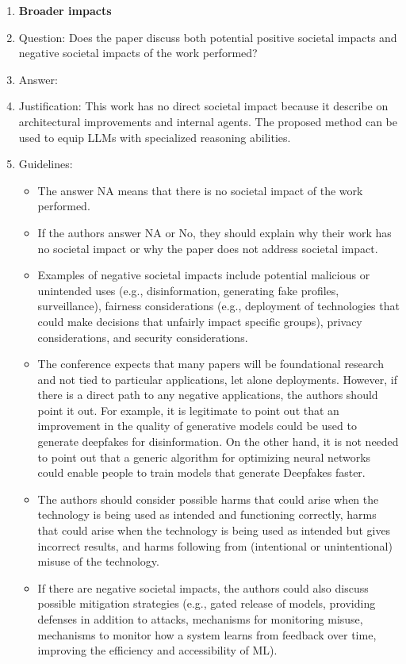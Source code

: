 \documentclass{article}
\theoremstyle{plain}
\theoremstyle{definition}
\theoremstyle{remark}
\begin{document}
\begin{enumerate}
\item {\bf Broader impacts}
    \item[] Question: Does the paper discuss both potential positive societal impacts and negative societal impacts of the work performed?
    \item[] Answer: \answerNA{} %
    \item[] Justification: This work has no direct societal impact because it describe on architectural improvements and internal agents. The proposed method can be used to equip LLMs with specialized reasoning abilities.
    \item[] Guidelines:
    \begin{itemize}
        \item The answer NA means that there is no societal impact of the work performed.
        \item If the authors answer NA or No, they should explain why their work has no societal impact or why the paper does not address societal impact.
        \item Examples of negative societal impacts include potential malicious or unintended uses (e.g., disinformation, generating fake profiles, surveillance), fairness considerations (e.g., deployment of technologies that could make decisions that unfairly impact specific groups), privacy considerations, and security considerations.
        \item The conference expects that many papers will be foundational research and not tied to particular applications, let alone deployments. However, if there is a direct path to any negative applications, the authors should point it out. For example, it is legitimate to point out that an improvement in the quality of generative models could be used to generate deepfakes for disinformation. On the other hand, it is not needed to point out that a generic algorithm for optimizing neural networks could enable people to train models that generate Deepfakes faster.
        \item The authors should consider possible harms that could arise when the technology is being used as intended and functioning correctly, harms that could arise when the technology is being used as intended but gives incorrect results, and harms following from (intentional or unintentional) misuse of the technology.
        \item If there are negative societal impacts, the authors could also discuss possible mitigation strategies (e.g., gated release of models, providing defenses in addition to attacks, mechanisms for monitoring misuse, mechanisms to monitor how a system learns from feedback over time, improving the efficiency and accessibility of ML).
    \end{itemize}
    

\end{enumerate}
\end{document}
